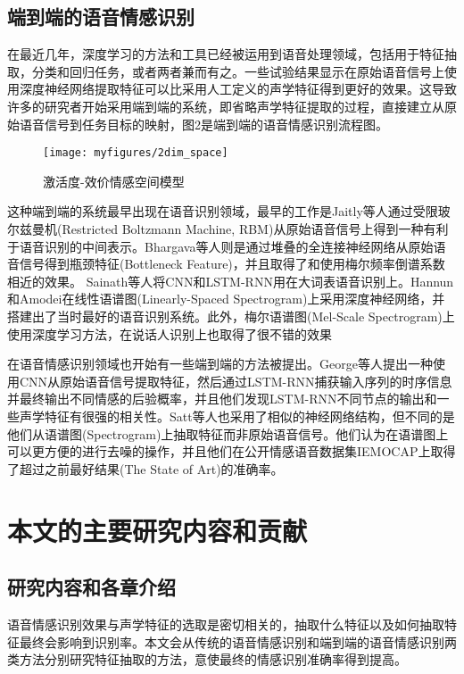 \subsection{端到端的语音情感识别}
\label{ssec:end2end_emo_rec}
在最近几年，深度学习的方法和工具已经被运用到语音处理领域，包括用于特征抽取，分类和回归任务，或者两者兼而有之。一些试验结果显示在原始语音信号上使用深度神经网络提取特征可以比采用人工定义的声学特征得到更好的效果。这导致许多的研究者开始采用端到端的系统，即省略声学特征提取的过程，直接建立从原始语音信号到任务目标的映射，图2是端到端的语音情感识别流程图。

\begin{figure}[H] %
    \centering
    \texttt{[image: myfigures/2dim\_space]}
    \caption{激活度-效价情感空间模型}
    \label{fig:xfig1}
\end{figure}

这种端到端的系统最早出现在语音识别领域，最早的工作是Jaitly等人通过受限玻尔兹曼机(Restricted Boltzmann Machine, RBM)从原始语音信号上得到一种有利于语音识别的中间表示。Bhargava等人则是通过堆叠的全连接神经网络从原始语音信号得到瓶颈特征(Bottleneck Feature)，并且取得了和使用梅尔频率倒谱系数相近的效果。 Sainath等人将CNN和LSTM-RNN用在大词表语音识别上。Hannun和Amodei在线性语谱图(Linearly-Spaced Spectrogram)上采用深度神经网络，并搭建出了当时最好的语音识别系统。此外，梅尔语谱图(Mel-Scale Spectrogram)上使用深度学习方法，在说话人识别上也取得了很不错的效果

在语音情感识别领域也开始有一些端到端的方法被提出。George等人提出一种使用CNN从原始语音信号提取特征，然后通过LSTM-RNN捕获输入序列的时序信息并最终输出不同情感的后验概率，并且他们发现LSTM-RNN不同节点的输出和一些声学特征有很强的相关性。Satt等人也采用了相似的神经网络结构，但不同的是他们从语谱图(Spectrogram)上抽取特征而非原始语音信号。他们认为在语谱图上可以更方便的进行去噪的操作，并且他们在公开情感语音数据集IEMOCAP上取得了超过之前最好结果(The State of Art)的准确率。

\section{本文的主要研究内容和贡献}
\label{sec:content_contribution}

\subsection{研究内容和各章介绍}
\label{ssec:content}
语音情感识别效果与声学特征的选取是密切相关的，抽取什么特征以及如何抽取特征最终会影响到识别率。本文会从传统的语音情感识别和端到端的语音情感识别两类方法分别研究特征抽取的方法，意使最终的情感识别准确率得到提高。

